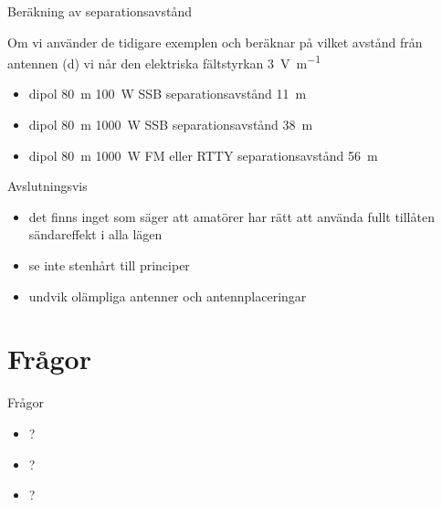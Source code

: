 \documentclass{beamer}
\begin{document}
\begin{frame}{Beräkning av separationsavstånd}

Om vi använder de tidigare exemplen och beräknar på vilket avstånd från antennen
(d) vi når den elektriska fältstyrkan \SI{3}{\volt\per\meter}
\begin{itemize}
	\item dipol \SI{80}{\meter} \SI{100}{\watt} SSB separationsavstånd \SI{11}{\meter}
	\item dipol \SI{80}{\meter} \SI{1000}{\watt} SSB separationsavstånd \SI{38}{\meter}
	\item dipol \SI{80}{\meter} \SI{1000}{\watt} FM eller RTTY separationsavstånd \SI{56}{\meter}
\end{itemize}
\end{frame}

\begin{frame}{Avslutningsvis}

\begin{itemize}
	\item det finns inget som säger att amatörer har rätt att använda fullt
	tillåten sändareffekt i alla lägen
	\item se inte stenhårt till principer
	\item undvik olämpliga antenner och antennplaceringar
\end{itemize}
\end{frame}

\section{Frågor}

\begin{frame}{Frågor}

\begin{itemize}
	\item ?
	\item ?
	\item ?
\end{itemize}
\end{frame}
\end{document}
